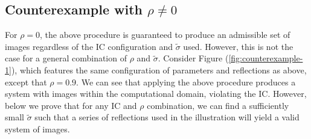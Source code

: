 

\subsection{Counterexample with $\rho \neq 0$}
For $\rho=0$, the above procedure is guaranteed to produce an
admissible set of images regardless of the IC configuration and
$\tilde{\sigma}$ used. However, this is not the case for a general
combination of $\rho$ and $\tilde{\sigma}$. Consider Figure
(\ref{fig:counterexample-1}), which features the same configuration of
parameters and reflections as above, except that $\rho=0.9$. We can
see that applying the above procedure produces a system with images
within the computational domain, violating the IC.  However, below we
prove that for any IC and $\rho$ combination, we can find a
sufficiently small $\tilde{\sigma}$ such that a series of reflections
used in the illustration will yield a valid system of images.
